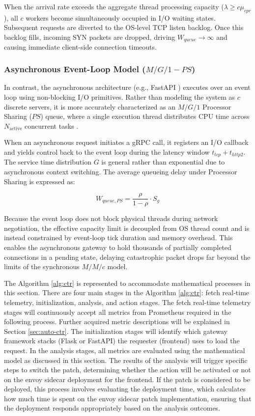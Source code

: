 \documentclass{ieeeaccess}
\begin{document}
When the arrival rate exceeds the aggregate thread processing capacity ($\lambda \ge c\mu_{cpr}$), all $c$ workers become simultaneously occupied in I/O waiting states. Subsequent requests are diverted to the OS-level TCP listen backlog. Once this backlog fills, incoming SYN packets are dropped, driving $W_{queue} \to \infty$ and causing immediate client-side connection timeouts.

\subsubsection{Asynchronous Event-Loop Model ($M/G/1-PS$)}
In contrast, the asynchronous architecture (e.g., FastAPI \cite{uvicorn}) executes over an event loop using non-blocking I/O primitives. Rather than modeling the system as $c$ discrete servers, it is more accurately characterized as an $M/G/1$ Processor Sharing ($PS$) queue, where a single execution thread distributes CPU time across $N_{\text{active}}$ concurrent tasks \cite{dalai2024novel}.

When an asynchronous request initiates a gRPC call, it registers an I/O callback and yields control back to the event loop during the latency window $t_{tcp} + t_{http2}$. The service time distribution $G$ is general rather than exponential due to asynchronous context switching. The average queueing delay under Processor Sharing is expressed as:

\begin{equation}
	W_{queue, PS} = \frac{\rho}{1 - \rho} \cdot S_{g}
\end{equation}

Because the event loop does not block physical threads during network negotiation, the effective capacity limit is decoupled from OS thread count and is instead constrained by event-loop tick duration and memory overhead. This enables the asynchronous gateway to hold thousands of partially completed connections in a pending state, delaying catastrophic packet drops far beyond the limits of the synchronous $M/M/c$ model.

The Algorithm \ref{alg:ctr} is represented to accommodate mathematical processes in this section. There are four main stages in the Algorithm \ref{alg:ctr}: fetch real-time telemetry, initialization, analysis, and action stages. The fetch real-time telemetry stages will continuously accept all metrics from Prometheus required in the following process. Further acquired metric descriptions will be explained in Section \ref{sec:auto-ctr}. The initialization stages will identify which gateway framework stacks (Flask or FastAPI) the requester (frontend) uses to load the request. In the analysis stages, all metrics are evaluated using the mathematical model as discussed in this section. The results of the analysis will trigger specific steps to switch the patch, determining whether the action will be activated or not on the envoy sidecar deployment for the frontend. If the patch is considered to be deployed, this process involves evaluating the deployment time, which calculates how much time is spent on the envoy sidecar patch implementation, ensuring that the deployment responds appropriately based on the analysis outcomes.
\end{document}

